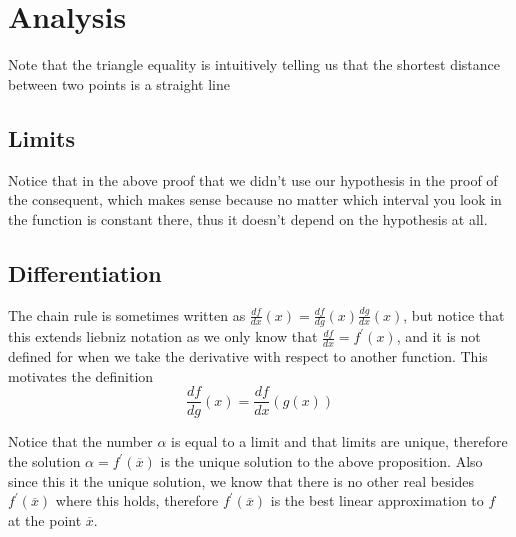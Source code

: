 \chapter{Analysis}


Note that the triangle equality is intuitively telling us that the shortest distance between two points is a straight line


\section{Limits}


Notice that in the above proof that we didn't use our hypothesis in the proof of the consequent, which makes sense because no matter which interval you look in the function is constant there, thus it doesn't depend on the hypothesis at all.




\newpage

\section{Differentiation}



The chain rule is sometimes written as $ \frac{df }{dx} \left( x \right) = \frac{df}{dg} \left( x \right) \frac{dg}{dx} \left( x \right)  $, but notice that this extends liebniz notation as we only know that $ \frac{df}{dx} = f ^{ \prime  } \left( x \right)   $, and it is not defined for when we take the derivative with respect to another function. This motivates the definition
\[
\frac{df}{dg} \left( x \right) =  \frac{df}{dx} \left( g\left( x \right)  \right)
\]

Notice that the number $ \alpha $ is equal to a limit and that limits are unique, therefore the solution $ \alpha =  f ^{ \prime } \left( \overline{x} \right)  $ is the unique solution to the above proposition. Also since this it the unique solution, we know that there is no other real besides $ f ^{ \prime } \left( \overline{x} \right)  $ where this holds, therefore $ f ^{ \prime } \left( \overline{x} \right)  $ is the best linear approximation to $ f $ at the point $ \overline{x} $. 

